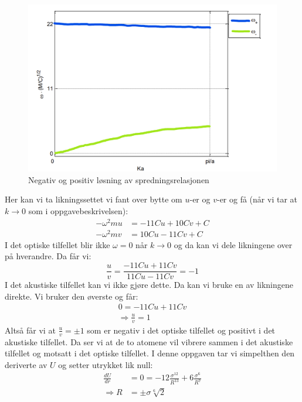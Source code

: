 \documentclass{article}
\begin{document}
\begin{figure}[H]
    \centering
    \includegraphics[width=0.75\linewidth]{bilder_lf/spredningsrelasjon_diatomisk_koblet.png}
    \caption{Negativ og positiv løsning av spredningsrelasjonen}
    \label{fig:spredningsrelasjon_diatomisk_koblet}
\end{figure}
Her kan vi ta likningssettet vi fant over bytte om $u$-er og $v$-er og få (når vi tar at $k \rightarrow 0$ som i oppgavebeskrivelsen):
\begin{align}
     -\omega^2 m u &= -11 C u + 10 C v + C \\
     -\omega^2 m v &= 10 C u - 11 C v + C
\end{align}
I det optiske tilfellet blir ikke $\omega = 0$ når $k \rightarrow 0$ og da kan vi dele likningene over på hverandre. Da får vi:
\begin{equation}
    \frac{u}{v} = \frac{-11 Cu + 11Cv}{11 Cu - 11 Cv} = -1
\end{equation}
I det akustiske tilfellet kan vi ikke gjøre dette. Da kan vi bruke en av likningene direkte. Vi bruker den øverste og får:
\begin{align}
    0 = -11 C u + 11 Cv\\
    \Rightarrow \frac{u}{v} = 1
\end{align}
Altså får vi at $\frac{u}{v} = \pm 1$ som er negativ i det optiske tilfellet og positivt i det akustiske tilfellet. Da ser vi at de to atomene vil vibrere sammen i det akustiske tilfellet og motsatt i det optiske tilfellet.
I denne oppgaven tar vi simpelthen den deriverte av $U$ og setter utrykket lik null:
\begin{align}
    \frac{dU}{dr} &= 0 = -12 \frac{\sigma^12}{R^13} + 6\frac{\sigma^6}{R^7} \\
    \Rightarrow R &= \pm \sigma \sqrt[6]{2}
\end{align}
\end{document}
